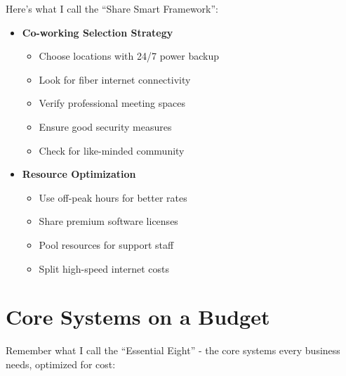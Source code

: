 Here's what I call the ``Share Smart Framework'':

\begin{itemize}
    \item \textbf{Co-working Selection Strategy}
    \begin{itemize}
        \item Choose locations with 24/7 power backup
        \item Look for fiber internet connectivity
        \item Verify professional meeting spaces
        \item Ensure good security measures
        \item Check for like-minded community
    \end{itemize}

    \item \textbf{Resource Optimization}
    \begin{itemize}
        \item Use off-peak hours for better rates
        \item Share premium software licenses
        \item Pool resources for support staff
        \item Split high-speed internet costs
    \end{itemize}
\end{itemize}

\section{Core Systems on a Budget}\label{sec:budget-systems}

Remember what I call the ``Essential Eight'' - the core systems every business needs, optimized for cost:

